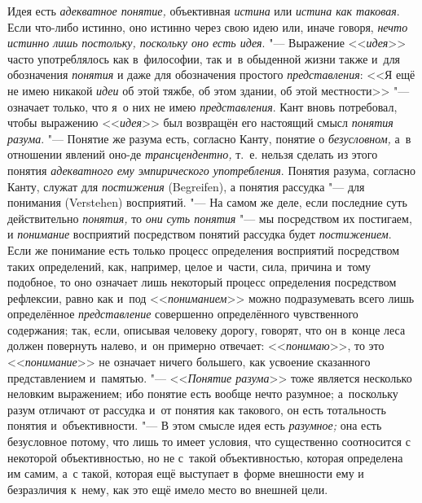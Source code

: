 Идея есть {\em адекватное понятие,} объективная
{\em истина} или
{\em истина как таковая}.
Если что-либо истинно, оно истинно через свою идею или, иначе
говоря, {\em нечто истинно лишь
постольку, поскольку оно есть идея}. "--- Выражение
<<{\em идея}>> часто
употреблялось как в~философии, так и~в обыденной жизни также и~для
обозначения {\em понятия}
и даже для обозначения простого
{\em представления}: <<Я
ещё не имею никакой {\em идеи}
об этой тяжбе, об этом здании, об этой местности>>
"--- означает только, что я~о них не имею
{\em представления}. Кант
вновь потребовал, чтобы выражению
<<{\em идея}>> был
возвращён его настоящий смысл
{\em понятия разума}.
"--- Понятие же разума есть, согласно Канту, понятие о
{\em безусловном,} а~в
отношении явлений оно-де
{\em трансцендентно,}
т.~е. нельзя сделать из этого понятия
{\em адекватного ему эмпирического
употребления}. Понятия разума, согласно Канту, служат для
{\em постижения} (Begreifen),
а понятия рассудка "--- для понимания (Verstehen)
восприятий. "--- На самом же деле, если последние суть
действительно {\em понятия,} то {\em они}
{\em суть понятия} "--- мы посредством их постигаем, и {\em понимание}
восприятий посредством понятий рассудка будет {\em постижением}. Если
же понимание есть только процесс определения восприятий посредством таких
определений, как, например, целое и~части, сила, причина и~тому подобное,
то оно означает лишь некоторый процесс определения посредством рефлексии,
равно как и~под <<{\em пониманием}>>
можно подразумевать всего лишь определённое {\em представление}
совершенно определённого чувственного содержания; так, если,
описывая человеку дорогу, говорят, что он в~конце леса должен повернуть
налево, и~он примерно отвечает: <<{\em понимаю}>>, то это
<<{\em понимание}>> не означает ничего большего, как усвоение сказанного
представлением и~памятью. "--- <<{\em Понятие разума}>>
тоже является несколько неловким выражением; ибо понятие есть
вообще нечто разумное; а~поскольку разум отличают от рассудка и~от понятия
как такового, он есть тотальность понятия и~объективности. "---
В этом смысле идея есть {\em разумное;} она есть
безусловное потому, что лишь то имеет условия, что существенно соотносится
с некоторой объективностью, но не с~такой объективностью, которая
определена им самим, а~с такой, которая ещё выступает в~форме внешности ему
и безразличия к~нему, как это ещё имело место во внешней цели.

